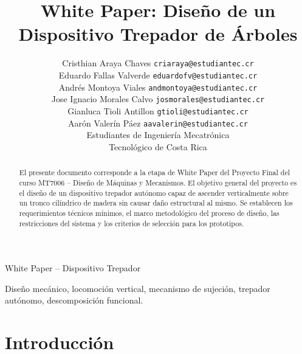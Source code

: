 \documentclass[lettersize,journal]{IEEEtran}
\begin{document}

\title{\textbf{White Paper: Diseño de un Dispositivo Trepador de Árboles}}

\author{
Cristhian Araya Chaves \texttt{criaraya@estudiantec.cr} \\
Eduardo Fallas Valverde \texttt{eduardofv@estudiantec.cr} \\
Andrés Montoya Viales \texttt{andmontoya@estudiantec.cr} \\
Jose Ignacio Morales Calvo \texttt{josmorales@estudiantec.cr} \\
Gianluca Tioli Antillon \texttt{gtioli@estudiantec.cr} \\
Aarón Valerín Páez \texttt{aavalerin@estudiantec.cr} \\
Estudiantes de Ingeniería Mecatrónica \\
Tecnológico de Costa Rica
}

%
{White Paper -- Dispositivo Trepador}

\maketitle

\begin{abstract}
El presente documento corresponde a la etapa de White Paper del Proyecto Final del
curso MT7006 -- Diseño de Máquinas y Mecanismos. El objetivo general del proyecto es
el diseño de un dispositivo trepador autónomo capaz de ascender
verticalmente sobre un tronco cilíndrico de madera sin causar daño estructural al
mismo. Se establecen los requerimientos técnicos mínimos, el marco metodológico del
proceso de diseño, las restricciones del sistema y los criterios de selección para los prototipos.
\end{abstract}

\begin{IEEEkeywords}
Diseño mecánico, locomoción vertical, mecanismo de sujeción, trepador autónomo,
descomposición funcional.
\end{IEEEkeywords}


\section{\textbf{Introducción}}
\end{document}
